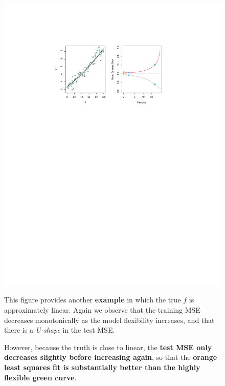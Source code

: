 \documentclass[a4paper]{article}
\newcommand{\example}[1]{\textcolor{Green4}{\textbf{#1}}}
\newcommand{\highspace}{\vspace{1.2em}\noindent}
\begin{document}
    \begin{figure}[!htp]
        \begin{examplebox}
            \begin{center}
                \includegraphics[width=\textwidth]{img/measuring-the-quality-of-fit-2.pdf}
                \label{fig: measuring the quality of fit - 2}
            \end{center}

            This figure provides another \example{example} in which the true $f$ is approximately linear. Again we observe that the training MSE decreases monotonically as the model flexibility increases, and that there is a \emph{U-shape} in the test MSE. 
            
            \highspace
            However, because the truth is close to linear, the \textbf{test MSE only decreases slightly before increasing again}, so that the \textbf{orange least squares fit is substantially better than the highly flexible green curve}.
        \end{examplebox}
    \end{figure}
\end{document}
